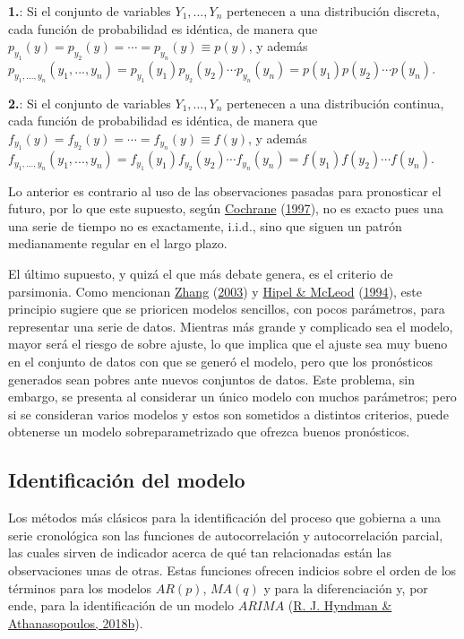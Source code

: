 \documentclass[
]{article}
\begin{document}
\textbf{1.}: Si el conjunto de variables \(Y_1,...,Y_n\) pertenecen a
una distribución discreta, cada función de probabilidad es idéntica, de
manera que \(p_{y_1}(y)=p_{y_2}(y)=\cdots=p_{y_n}(y)\equiv p(y)\), y
además
\(p_{y_1,...,y_n}(y_1,...,y_n)=p_{y_1}(y_1)p_{y_2}(y_2)\cdots p_{y_n}(y_n)=p(y_1)p(y_2)\cdots p(y_n)\).

\textbf{2.}: Si el conjunto de variables \(Y_1,...,Y_n\) pertenecen a
una distribución continua, cada función de probabilidad es idéntica, de
manera que \(f_{y_1}(y)=f_{y_2}(y)=\cdots=f_{y_n}(y)\equiv f(y)\), y
además
\(f_{y_1,...,y_n}(y_1,...,y_n)=f_{y_1}(y_1)f_{y_2}(y_2)\cdots f_{y_n}(y_n)=f(y_1)f(y_2)\cdots f(y_n)\).

Lo anterior es contrario al uso de las observaciones pasadas para
pronosticar el futuro, por lo que este supuesto, según
\protect\hyperlink{ref-Cochrane}{Cochrane}
(\protect\hyperlink{ref-Cochrane}{1997}), no es exacto pues una una
serie de tiempo no es exactamente, i.i.d., sino que siguen un patrón
medianamente regular en el largo plazo.

El último supuesto, y quizá el que más debate genera, es el criterio de
parsimonia. Como mencionan \protect\hyperlink{ref-Zhang}{Zhang}
(\protect\hyperlink{ref-Zhang}{2003}) y
\protect\hyperlink{ref-Hipel}{Hipel \& McLeod}
(\protect\hyperlink{ref-Hipel}{1994}), este principio sugiere que se
prioricen modelos sencillos, con pocos parámetros, para representar una
serie de datos. Mientras más grande y complicado sea el modelo, mayor
será el riesgo de sobre ajuste, lo que implica que el ajuste sea muy
bueno en el conjunto de datos con que se generó el modelo, pero que los
pronósticos generados sean pobres ante nuevos conjuntos de datos. Este
problema, sin embargo, se presenta al considerar un único modelo con
muchos parámetros; pero si se consideran varios modelos y estos son
sometidos a distintos criterios, puede obtenerse un modelo
sobreparametrizado que ofrezca buenos pronósticos.

\subsection{Identificación del modelo}

Los métodos más clásicos para la identificación del proceso que gobierna
a una serie cronológica son las funciones de autocorrelación y
autocorrelación parcial, las cuales sirven de indicador acerca de qué
tan relacionadas están las observaciones unas de otras. Estas funciones
ofrecen indicios sobre el orden de los términos para los modelos
\(AR(p)\), \(MA(q)\) y para la diferenciación y, por ende, para la
identificación de un modelo \(ARIMA\)
(\protect\hyperlink{ref-hyndman_box-jenkins}{R. J. Hyndman \&
Athanasopoulos, 2018b}).
\end{document}
